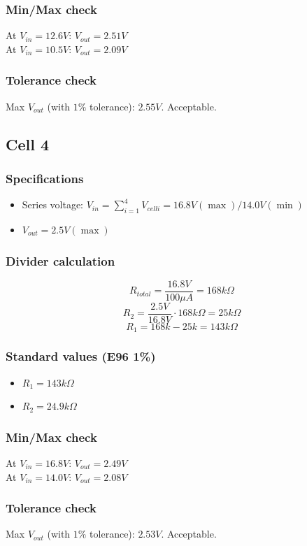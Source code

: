 \documentclass{article}
\begin{document}
\subsubsection{Min/Max check}
At $V_{in} = 12.6V$: $V_{out} = 2.51V$ \\
At $V_{in} = 10.5V$: $V_{out} = 2.09V$

\subsubsection{Tolerance check}
Max $V_{out}$ (with $1\%$ tolerance): $2.55V$. Acceptable.

\subsection{Cell 4}
\subsubsection{Specifications}
\begin{itemize}
\item Series voltage: $V_{in} = \sum_{i=1}^{4} V_{celli} = 16.8V (\max) / 14.0V (\min)$
\item $V_{out} = 2.5V (\max)$
\end{itemize}

\subsubsection{Divider calculation}
$$R_{total} = \frac{16.8V}{100\mu A} = 168k\Omega$$
$$R_2 = \frac{2.5V}{16.8V} \cdot 168k\Omega = 25k\Omega$$
$$R_1 = 168k - 25k = 143k\Omega$$

\subsubsection{Standard values (E96 1\%)}
\begin{itemize}
\item $R_1 = 143k\Omega$
\item $R_2 = 24.9k\Omega$
\end{itemize}

\subsubsection{Min/Max check}
At $V_{in} = 16.8V$: $V_{out} = 2.49V$ \\
At $V_{in} = 14.0V$: $V_{out} = 2.08V$

\subsubsection{Tolerance check}
Max $V_{out}$ (with $1\%$ tolerance): $2.53V$. Acceptable.
\end{document}
